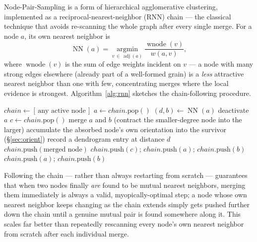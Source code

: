 \documentclass[11pt,a4paper]{article}
\begin{document}
Node-Pair-Sampling is a form of hierarchical agglomerative clustering, implemented as a
reciprocal-nearest-neighbor (RNN) chain — the classical technique that avoids re-scanning the whole
graph after every single merge. For a node $a$, its own nearest neighbor is
\begin{equation}
  \operatorname{NN}(a) = \operatorname*{argmin}_{v \,\in\, \operatorname{adj}(a)} \frac{\operatorname{wnode}(v)}{w(a,v)},
\end{equation}
where $\operatorname{wnode}(v)$ is the sum of edge weights incident on $v$ — a node with many strong
edges elsewhere (already part of a well-formed grain) is a \emph{less} attractive nearest neighbor
than one with few, concentrating merges where the local evidence is strongest. Algorithm~\ref{alg:rnn}
sketches the chain-following procedure.

\begin{algorithm}
\caption{Reciprocal-nearest-neighbor chain clustering}
\label{alg:rnn}
\begin{algorithmic}[1]
  \State $\mathit{chain} \gets [\,\text{any active node}\,]$
    \State $a \gets \mathit{chain}.\text{pop}()$
    \State $(d,b) \gets \operatorname{NN}(a)$
     
      \State deactivate $a$
      \State $c \gets \mathit{chain}.\text{pop}()$
       
        \State merge $a$ and $b$ (contract the smaller-degree node into the larger)
        \State accumulate the absorbed node's own orientation into the survivor (\S\ref{sec:orient})
        \State record a dendrogram entry at distance $d$
        \State $\mathit{chain}.\text{push}(\text{merged node})$
      \Else
        \State $\mathit{chain}.\text{push}(c)$; $\mathit{chain}.\text{push}(a)$; $\mathit{chain}.\text{push}(b)$
      \EndIf
    \Else
      \State $\mathit{chain}.\text{push}(a)$; $\mathit{chain}.\text{push}(b)$
    \EndIf
  \EndWhile
\EndWhile
\end{algorithmic}
\end{algorithm}

Following the chain — rather than always restarting from scratch — guarantees that when two nodes
finally \emph{are} found to be mutual nearest neighbors, merging them immediately is always a valid,
myopically-optimal step; a node whose own nearest neighbor keeps changing as the chain extends
simply gets pushed further down the chain until a genuine mutual pair is found somewhere along it.
This scales far better than repeatedly rescanning every node's own nearest neighbor from scratch
after each individual merge.
\end{document}
